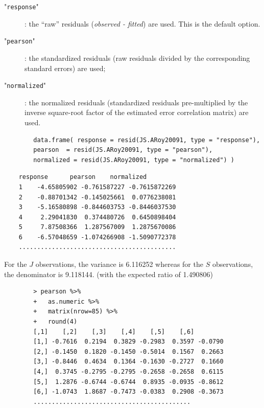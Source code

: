 \documentclass[12pt, a4paper]{report}
\theoremstyle{plain}
\theoremstyle{definition}
\theoremstyle{remark}
\begin{document}
	\begin{description}
		\item["\texttt{response}"]: the “raw” residuals (\textit{observed - fitted}) are used. This is the default option.
		\item["\texttt{pearson}"]: the standardized residuals (raw residuals divided by the corresponding standard errors) are used; 
		\item["\texttt{normalized}"]: the normalized residuals (standardized residuals pre-multiplied by the inverse square-root factor of the estimated error correlation matrix) are used.
	\end{description}
	
	\begin{framed}
		\begin{verbatim}
		data.frame( response = resid(JS.ARoy20091, type = "response"), 
		pearson  = resid(JS.ARoy20091, type = "pearson"), 
		normalized = resid(JS.ARoy20091, type = "normalized") )
		\end{verbatim}
	\end{framed}
	
	\begin{verbatim}
	response      pearson    normalized
	1    -4.65805902 -0.761587227 -0.7615872269
	2    -0.88701342 -0.145025661  0.0776238081
	3    -5.16580898 -0.844603753 -0.8446037530
	4     2.29041830  0.374480726  0.6450898404
	5     7.87508366  1.287567009  1.2875670086
	6    -6.57048659 -1.074266908 -1.5090772378
	...........................................
	\end{verbatim}
	For the $J$ observations, the variance is 6.116252 whereas for the $S$ observations, the denominator is 9.118144. (with the expected ratio of  1.490806)
	
	
	\begin{framed}
		\begin{verbatim}
		> pearson %>%
		+   as.numeric %>% 
		+   matrix(nrow=85) %>%
		+   round(4) 
		[,1]    [,2]    [,3]    [,4]    [,5]    [,6]
		[1,] -0.7616  0.2194  0.3829 -0.2983  0.3597 -0.0790
		[2,] -0.1450  0.1820 -0.1450 -0.5014  0.1567  0.2663
		[3,] -0.8446  0.4634  0.1364 -0.1630 -0.2727  0.1660
		[4,]  0.3745 -0.2795 -0.2795 -0.2658 -0.2658  0.6115
		[5,]  1.2876 -0.6744 -0.6744  0.8935 -0.0935 -0.8612
		[6,] -1.0743  1.8687 -0.7473 -0.0383  0.2908 -0.3673
		...........................................
		
		\end{verbatim}
	\end{framed}
	
\end{document}
